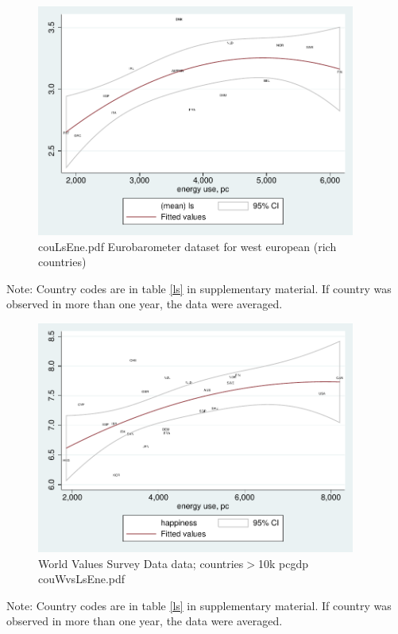\documentclass[10pt, letterpaper]{article}
\begin{document}
\begin{spacing}{1.4}
\begin{figure}[H]
 \includegraphics[height=3in]{graphsAndTables/couLsEne.pdf}\centering
\caption{couLsEne.pdf Eurobarometer dataset for west european (rich countries)}\label{couLsEne.pdf}
\end{figure}
{\scriptsize Note: Country codes are in table \ref{ls} in supplementary
  material. If country was observed in more than one year, the data were averaged.}

\begin{figure}[H]
 \includegraphics[height=3in]{graphsAndTables/couWvsLsEne.pdf}\centering
\caption{World Values Survey Data data; countries$>$10k pcgdp couWvsLsEne.pdf}\label{couWvsLsEne.pdf}
\end{figure}
{\scriptsize Note: Country codes are in table \ref{ls} in supplementary
  material. If country was observed in more than one year, the data were averaged.}



\end{spacing}
\end{document}
